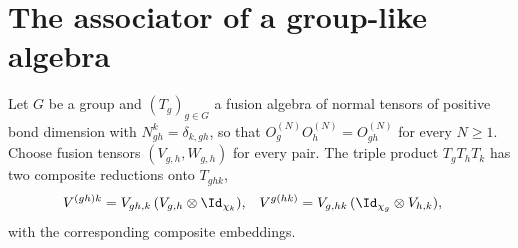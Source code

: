 \section{The associator of a group-like algebra}%
\label{sec:mpoalg_associator}

Let $G$ be a group and $(T_g)_{g\in G}$ a fusion algebra of normal tensors of
positive bond dimension with $N_{gh}^k=\delta_{k,gh}$, so that
$O_g^{(N)}O_h^{(N)}=O_{gh}^{(N)}$ for every $N\geq1$. Choose fusion tensors
$(V_{g,h},W_{g,h})$ for every pair. The triple product $T_gT_hT_k$ has two
composite reductions onto $T_{ghk}$,
\begin{align}
    V^{(gh)k}
     & =V_{gh,k}\,(V_{g,h}\otimes\Id_{\chi_k}),
     &
    V^{g(hk)}
     & =V_{g,hk}\,(\Id_{\chi_g}\otimes V_{h,k}),
    \label{eq:mpoalg_composite_compressions}
\end{align}
with the corresponding composite embeddings.


